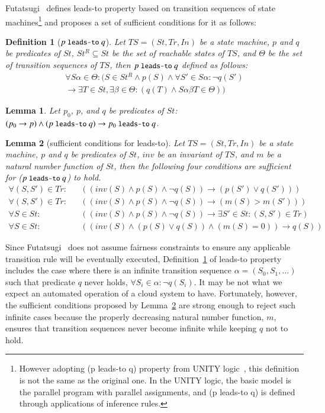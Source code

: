 \documentclass[12pt]{report}
\newtheorem{lemma}{Lemma}
\newtheorem{definition}{Definition}
\newcommand{\ra}{\rightarrow}
\newcommand{\mbstt}[1]{\mbox{\small{\tt {#1}}}}
\newcommand{\ul}{\underline}
\begin{document}
Futatsugi~\cite{Futatsugi15} defines leads-to property based on
transition sequences of state machines\footnote{However adopting (p
  leads-to q) property from UNITY
  logic~\cite{DBLP:books/daglib/0067338}, this definition is not the
  same as the original one. In the UNITY logic, the basic model is the
  parallel program with parallel assignments, and (p leads-to q) is
  defined through applications of inference rules.} and proposes a set
of sufficient conditions for it as follows:
\begin{definition}[$p~\mbstt{leads-to}~q$]
\label{def:leadsto}
  Let $TS=(S\!t,T\!r,In)$ be a state machine, $p$ and $q$ be predicates of
  $S\!t$, $S\!t^R\subseteq S\!t$ be the set of reachable states of $TS$, and
  $\Theta$ be the set of transition sequences of $TS$, then
  \ul{$p~\mbstt{leads-to}~q$} defined as follows:
  \begin{eqnarray*}
  \forall S\alpha\in \Theta: (S\in S\!t^R \land p(S) \land
  \forall S'\in S\alpha: \neg q(S')\\
  \ra \exists T\in S\!t, \exists\beta\in\Theta:(q(T) \land S\alpha\beta T\in \Theta))
  \end{eqnarray*}
\end{definition}

\begin{lemma}
  Let $p_0$, $p$, and $q$ be predicates of $S\!t$:
  $(p_0 \ra p) \land (p~\mbstt{leads-to}~q) \ra
  p_0~\mbstt{leads-to}~q$.
\end{lemma}

\begin{lemma}[sufficient conditions for leads-to]
\label{def:sufcond}
  Let $TS=(S\!t,T\!r,In)$ be a state machine, $p$ and $q$ be predicates of
  $S\!t$, $inv$ be an invariant of $TS$, and $m$ be a natural number
  function of $S\!t$, then the following four conditions are sufficient
  for ($p~\mbstt{leads-to}~q$) to hold.
\begin{eqnarray*}
\forall (S,S')\in T\!r:&&((inv(S)\land p(S)\land\neg q(S))\ra(p(S')\lor q(S')))\\
\forall (S,S')\in T\!r:&&((inv(S)\land p(S)\land\neg q(S))\ra(m(S) > m(S')))\\
\forall S\in S\!t:&&((inv(S)\land p(S)\land\neg q(S))\ra\exists S'\in S\!t:(S,S')\in T\!r)\\
\forall S\in S\!t:&&((inv(S)\land (p(S)\lor q(S))\land(m(S) = 0)) \ra q(S))
\end{eqnarray*}
\end{lemma}
Since Futatsugi~\cite{Futatsugi15} does not assume fairness
constraints to ensure any applicable transition rule will be eventually executed,
Definition~\ref{def:leadsto} of leads-to property includes the case
where there is an infinite transition sequence
$\alpha=(S\!_0,S\!_1,\dots)$ such that predicate $q$ never holds, $\forall
S\!_i\in\alpha:\neg q(S\!_i)$. It may be not what we expect an automated
operation of a cloud system to have. Fortunately, however, the
sufficient conditions proposed by Lemma~\ref{def:sufcond} are strong
enough to reject such infinite cases because the properly decreasing
natural number function, $m$, ensures that transition sequences never
become infinite while keeping $q$ not to hold.
\end{document}
